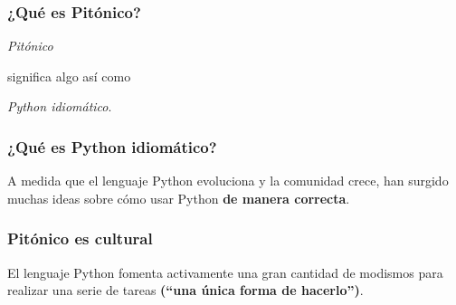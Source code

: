 \begin{frame}
\frametitle{¿Qué es Pitónico?}

\begin{center}
{\Huge

\emph{Pitónico}

significa algo así como

\vspace{.3cm}

\emph{Python idiomático}.
}
\end{center}

\end{frame}

\begin{frame}
\frametitle{¿Qué es Python idiomático?}

{\Large

A medida que el lenguaje Python evoluciona y la comunidad crece, han surgido muchas ideas sobre cómo usar Python {\bf de  manera correcta}. 

}

\end{frame}

\begin{frame}
\frametitle{Pitónico es cultural}

{\Large

El lenguaje Python fomenta activamente una gran cantidad de modismos para realizar una serie de tareas {\bf (``una única forma de hacerlo'')}. 

}

\end{frame}

